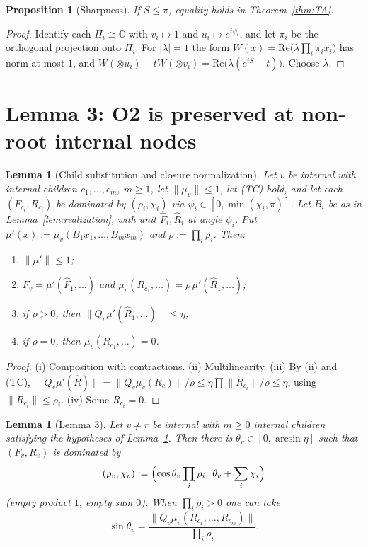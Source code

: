 \documentclass[11pt]{amsart}
\newtheorem{lemma}[theorem]{Lemma}
\newtheorem{proposition}[theorem]{Proposition}
\theoremstyle{definition}
\newcommand{\C}{\mathbb{C}}
\newcommand{\norm}[1]{\lVert #1\rVert}
\newcommand{\abs}[1]{\lvert #1\rvert}
\begin{document}
\begin{proposition}[Sharpness]\label{prop:TAsharp}
If $S\le\pi$, equality holds in Theorem~\ref{thm:TA}.
\end{proposition}

\begin{proof}
Identify each $\Pi_i\cong\C$ with $v_i\mapsto1$ and $u_i\mapsto e^{i\psi_i}$, and let
$\pi_i$ be the orthogonal projection onto $\Pi_i$. For $\abs\lambda=1$ the form
$W(x)=\mathrm{Re}\bigl(\lambda\prod_i\pi_ix_i\bigr)$ has norm at most $1$, and
$W(\otimes u_i)-tW(\otimes v_i)=\mathrm{Re}\bigl(\lambda(e^{iS}-t)\bigr)$. Choose $\lambda$.
\end{proof}

\section{Lemma 3: O2 is preserved at non-root internal nodes}\label{sec:lemma3}

\begin{lemma}[Child substitution and closure normalization]\label{lem:substitution}
Let $v$ be internal with internal children $c_1,\dots,c_m$, $m\ge1$, let
$\norm{\mu_v}\le1$, let (TC) hold, and let each $(F_{c_i},R_{c_i})$ be dominated by
$(\rho_i,\chi_i)$ via $\psi_i\in[0,\min(\chi_i,\pi)]$. Let $B_i$ be as in
Lemma~\ref{lem:realization}, with unit $\hat F_i,\hat R_i$ at angle $\psi_i$. Put
$\mu'(x):=\mu_v(B_1x_1,\dots,B_mx_m)$ and $\rho:=\prod_i\rho_i$. Then:
\begin{enumerate}[label=\textup{(\roman*)}]
\item $\norm{\mu'}\le1$;
\item $F_v=\mu'(\hat F_1,\dots)$ and $\mu_v(R_{c_1},\dots)=\rho\,\mu'(\hat R_1,\dots)$;
\item if $\rho>0$, then $\norm{Q_v\mu'(\hat R_1,\dots)}\le\eta$;
\item if $\rho=0$, then $\mu_v(R_{c_1},\dots)=0$.
\end{enumerate}
\end{lemma}

\begin{proof}
(i) Composition with contractions. (ii) Multilinearity. (iii) By (ii) and (TC),
$\norm{Q_v\mu'(\hat R)}=\norm{Q_v\mu_v(R_c)}/\rho\le\eta\prod\norm{R_{c_i}}/\rho\le\eta$,
using $\norm{R_{c_i}}\le\rho_i$. (iv) Some $R_{c_i}=0$.
\end{proof}

\begin{lemma}[Lemma 3]\label{lem:lemma3}
Let $v\ne r$ be internal with $m\ge0$ internal children satisfying the hypotheses of
Lemma~\ref{lem:substitution}. Then there is $\theta_v\in[0,\arcsin\eta]$ such that
$(F_v,R_v)$ is dominated by
\[
(\rho_v,\chi_v):=\Bigl(\cos\theta_v\prod_i\rho_i,\;\theta_v+\sum_i\chi_i\Bigr)
\]
(empty product $1$, empty sum $0$). When $\prod_i\rho_i>0$ one can take
\[
\sin\theta_v=\frac{\norm{Q_v\mu_v(R_{c_1},\dots,R_{c_m})}}{\prod_i\rho_i}.
\]
\end{lemma}
\end{document}
